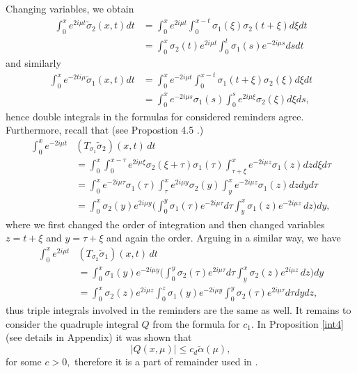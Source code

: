 \documentclass[11pt]{amsart}
\theoremstyle{plain}
\theoremstyle{definition}
\theoremstyle{remark}
\numberwithin{equation}{section}
\begin{document}
Changing variables, we obtain
\begin{align*}
\int_0^x e^{2i\mu t} \tilde{\sigma}_2(x,t)dt&=\int_0^xe^{2i\mu t}\int_0^{x-t}\sigma_1(\xi)\sigma_2(t+\xi) d \xi dt\nonumber\\
&= \int_0^x\sigma_2(t)e^{2i\mu t}\int_0^t\sigma_1(s)e^{-2i\mu s} ds dt
\end{align*}
and similarly
\begin{align*}
\int_0^x e^{-2ti\mu} \tilde{\sigma}_1(x,t)dt&=\int_0^xe^{-2i\mu t}\int_0^{x-t}\sigma_1(t+\xi)\sigma_2(\xi) d \xi dt\\
&=\int_0^xe^{-2i\mu s}\sigma_1(s)\int_0^s e^{2i\mu \xi}\sigma_2(\xi) d \xi ds,
\end{align*}
hence double integrals in the formulas for considered reminders agree.
Furthermore, recall that (see Propostion 4.5 \cite{Rzep21}.)
\begin{align*}
\int_0^xe^{-2i\mu t}& (T_{\sigma_1}\tilde{\sigma}_2)(x,t)\,dt\\
&= \int_0^x \int_0^{x-\tau}e^{2i\mu \xi}\sigma_2(\xi+\tau)\sigma_1(\tau)\int_{\tau+\xi}^xe^{-2i\mu z} \sigma_1(z) d z d\xi d\tau\\
&= \int_0^xe^{-2i\mu \tau} \sigma_1(\tau)\int_\tau^{x}e^{2i\mu y}\sigma_2(y)\int_{y}^xe^{-2i\mu z} \sigma_1(z) d z dy d\tau\\
&=\int_0^x\sigma_2(y)e^{2i\mu y} \Bigg(\int_0^{y}\sigma_1(\tau)e^{-2i\mu \tau} d\tau \int_y^x \sigma_1(z)e^{-2i\mu z}\, d z\Bigg) dy,
\end{align*}
where we first changed the order of integration and then  changed variables $z=t+\xi$ and $y=\tau+\xi$ and again the order.
Arguing in a similar way, we have
\begin{align*}
\int_0^xe^{2i\mu t}& (T_{\sigma_2}\tilde{\sigma}_1)(x,t)\,dt\\
&=\int_0^x\sigma_1(y)e^{-2i\mu y} \Bigg(\int_0^{y}\sigma_2(\tau)e^{2i\mu \tau} d\tau \int_y^x \sigma_2(z)e^{2i\mu z}\, d z\Bigg) dy\\
&=\int_0^x\sigma_2(z)e^{2i\mu z} \int_0^z \sigma_1(y)e^{-2i\mu y}\int_0^{y}\sigma_2(\tau)e^{2i\mu \tau} d\tau dy dz,
\end{align*}
thus triple integrals involved in the reminders are the same as well.
It remains to consider the quadruple integral $Q$ from the formula for $c_1$. In Proposition \ref{int4} (see details in Appendix) it was shown that
$$
|Q(x,\mu)|\le c_d\widetilde{\alpha}(\mu),
$$
for some $c>0,$ therefore it is a part of remainder used in  \cite[Lemma 2.2]{Rzep21}.
\end{document}
